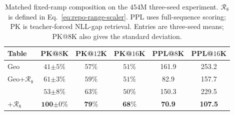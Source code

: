 \begin{table}[ht]
\centering\small
\caption{Matched fixed-ramp composition on the $454$M three-seed experiment.
$\mathcal R_8$ is defined in Eq.~\eqref{eq:repo-range-scaler}.
PPL uses full-sequence scoring; PK is teacher-forced NLL-gap retrieval.
Entries are three-seed means; PK@$8$K also gives the standard deviation.}
\label{tab:evq-repo-ramp}
\begin{tabular}{@{}lccccc@{}}
\toprule
Table & PK@$8$K & PK@$12$K & PK@$16$K & PPL@$8$K & PPL@$16$K \\
\midrule
Geo & $41{\scriptstyle\pm5}\%$ & $57\%$ & $51\%$ & 161.9 & 253.2 \\
Geo+$\mathcal R_8$ & $61{\scriptstyle\pm3}\%$ & $59\%$ & $51\%$ & 82.9 & 157.7 \\
\evq{} & $53{\scriptstyle\pm8}\%$ & $63\%$ & $50\%$ & 150.3 & 229.5 \\
\evq{}+$\mathcal R_8$ & $\mathbf{100}{\scriptstyle\pm0}\%$ & $\mathbf{79\%}$ & $\mathbf{68\%}$ & \textbf{70.9} & \textbf{107.5} \\
\bottomrule
\end{tabular}
\end{table}
